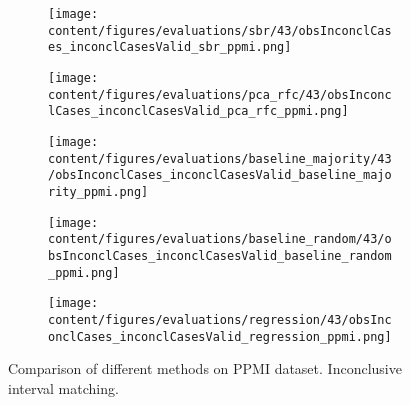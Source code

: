 \begin{figure}[t]
  \begin{subfigure}{0.5\textwidth}
    \centering
    \texttt{[image: content/figures/evaluations/sbr/43/obsInconclCases\_inconclCasesValid\_sbr\_ppmi.png]}
  \end{subfigure}
  \hfill
  \begin{subfigure}{0.5\textwidth}
    \centering
    \texttt{[image: content/figures/evaluations/pca\_rfc/43/obsInconclCases\_inconclCasesValid\_pca\_rfc\_ppmi.png]}
  \end{subfigure}
  \hfill
  \begin{subfigure}{0.5\textwidth}
    \centering
    \texttt{[image: content/figures/evaluations/baseline\_majority/43/obsInconclCases\_inconclCasesValid\_baseline\_majority\_ppmi.png]}
  \end{subfigure}
  \hfill
  \begin{subfigure}{0.5\textwidth}
    \centering
    \texttt{[image: content/figures/evaluations/baseline\_random/43/obsInconclCases\_inconclCasesValid\_baseline\_random\_ppmi.png]}
  \end{subfigure}
  \hfill
  \begin{subfigure}{0.5\textwidth}
    \centering
    \texttt{[image: content/figures/evaluations/regression/43/obsInconclCases\_inconclCasesValid\_regression\_ppmi.png]}
  \end{subfigure}

  \caption{Comparison of different methods on PPMI dataset. Inconclusive interval matching.}
  \label{fig:test_interval_match_ppmi}
\end{figure}


